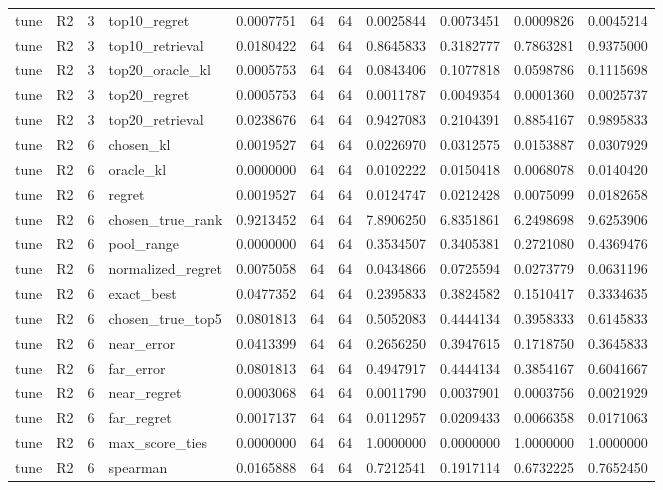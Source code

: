 \begin{tabular}{llrlrrrrrrr}
tune & R2 & 3 & top10_regret & 0.0007751 & 64 & 64 & 0.0025844 & 0.0073451 & 0.0009826 & 0.0045214 \\
tune & R2 & 3 & top10_retrieval & 0.0180422 & 64 & 64 & 0.8645833 & 0.3182777 & 0.7863281 & 0.9375000 \\
tune & R2 & 3 & top20_oracle_kl & 0.0005753 & 64 & 64 & 0.0843406 & 0.1077818 & 0.0598786 & 0.1115698 \\
tune & R2 & 3 & top20_regret & 0.0005753 & 64 & 64 & 0.0011787 & 0.0049354 & 0.0001360 & 0.0025737 \\
tune & R2 & 3 & top20_retrieval & 0.0238676 & 64 & 64 & 0.9427083 & 0.2104391 & 0.8854167 & 0.9895833 \\
tune & R2 & 6 & chosen_kl & 0.0019527 & 64 & 64 & 0.0226970 & 0.0312575 & 0.0153887 & 0.0307929 \\
tune & R2 & 6 & oracle_kl & 0.0000000 & 64 & 64 & 0.0102222 & 0.0150418 & 0.0068078 & 0.0140420 \\
tune & R2 & 6 & regret & 0.0019527 & 64 & 64 & 0.0124747 & 0.0212428 & 0.0075099 & 0.0182658 \\
tune & R2 & 6 & chosen_true_rank & 0.9213452 & 64 & 64 & 7.8906250 & 6.8351861 & 6.2498698 & 9.6253906 \\
tune & R2 & 6 & pool_range & 0.0000000 & 64 & 64 & 0.3534507 & 0.3405381 & 0.2721080 & 0.4369476 \\
tune & R2 & 6 & normalized_regret & 0.0075058 & 64 & 64 & 0.0434866 & 0.0725594 & 0.0273779 & 0.0631196 \\
tune & R2 & 6 & exact_best & 0.0477352 & 64 & 64 & 0.2395833 & 0.3824582 & 0.1510417 & 0.3334635 \\
tune & R2 & 6 & chosen_true_top5 & 0.0801813 & 64 & 64 & 0.5052083 & 0.4444134 & 0.3958333 & 0.6145833 \\
tune & R2 & 6 & near_error & 0.0413399 & 64 & 64 & 0.2656250 & 0.3947615 & 0.1718750 & 0.3645833 \\
tune & R2 & 6 & far_error & 0.0801813 & 64 & 64 & 0.4947917 & 0.4444134 & 0.3854167 & 0.6041667 \\
tune & R2 & 6 & near_regret & 0.0003068 & 64 & 64 & 0.0011790 & 0.0037901 & 0.0003756 & 0.0021929 \\
tune & R2 & 6 & far_regret & 0.0017137 & 64 & 64 & 0.0112957 & 0.0209433 & 0.0066358 & 0.0171063 \\
tune & R2 & 6 & max_score_ties & 0.0000000 & 64 & 64 & 1.0000000 & 0.0000000 & 1.0000000 & 1.0000000 \\
tune & R2 & 6 & spearman & 0.0165888 & 64 & 64 & 0.7212541 & 0.1917114 & 0.6732225 & 0.7652450 \\

\end{tabular}
